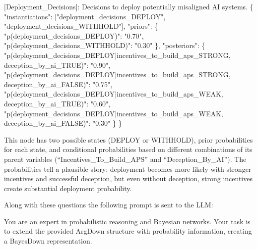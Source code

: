\documentclass[
  11pt,
  letterpaper,
  openany]{book}
\newenvironment{Shaded}{\begin{snugshade}}{\end{snugshade}}
\newcommand{\DataTypeTok}[1]{\textcolor[rgb]{0.68,0.00,0.00}{#1}}
\newcommand{\ErrorTok}[1]{\textcolor[rgb]{0.68,0.00,0.00}{#1}}
\newcommand{\FunctionTok}[1]{\textcolor[rgb]{0.28,0.35,0.67}{#1}}
\newcommand{\OtherTok}[1]{\textcolor[rgb]{0.00,0.23,0.31}{#1}}
\newcommand{\StringTok}[1]{\textcolor[rgb]{0.13,0.47,0.30}{#1}}
\begin{document}
\begin{landscape}
\begin{Shaded}
\begin{Highlighting}[]
\OtherTok{[}\ErrorTok{Deployment\_Decisions}\OtherTok{]}\ErrorTok{:} \ErrorTok{Decisions} \ErrorTok{to} \ErrorTok{deploy} \ErrorTok{potentially} \ErrorTok{misaligned} \ErrorTok{AI} \ErrorTok{systems.} \FunctionTok{\{}
  \DataTypeTok{"instantiations"}\FunctionTok{:} \OtherTok{[}\StringTok{"deployment\_decisions\_DEPLOY"}\OtherTok{,} \StringTok{"deployment\_decisions\_WITHHOLD"}\OtherTok{]}\FunctionTok{,}
  \DataTypeTok{"priors"}\FunctionTok{:} \FunctionTok{\{}
    \DataTypeTok{"p(deployment\_decisions\_DEPLOY)"}\FunctionTok{:} \StringTok{"0.70"}\FunctionTok{,}
    \DataTypeTok{"p(deployment\_decisions\_WITHHOLD)"}\FunctionTok{:} \StringTok{"0.30"}
  \FunctionTok{\},}
  \DataTypeTok{"posteriors"}\FunctionTok{:} \FunctionTok{\{}
    \DataTypeTok{"p(deployment\_decisions\_DEPLOY|incentives\_to\_build\_aps\_STRONG, deception\_by\_ai\_TRUE)"}\FunctionTok{:} \StringTok{"0.90"}\FunctionTok{,}
    \DataTypeTok{"p(deployment\_decisions\_DEPLOY|incentives\_to\_build\_aps\_STRONG, deception\_by\_ai\_FALSE)"}\FunctionTok{:} \StringTok{"0.75"}\FunctionTok{,}
    \DataTypeTok{"p(deployment\_decisions\_DEPLOY|incentives\_to\_build\_aps\_WEAK, deception\_by\_ai\_TRUE)"}\FunctionTok{:} \StringTok{"0.60"}\FunctionTok{,}
    \DataTypeTok{"p(deployment\_decisions\_DEPLOY|incentives\_to\_build\_aps\_WEAK, deception\_by\_ai\_FALSE)"}\FunctionTok{:} \StringTok{"0.30"}
  \FunctionTok{\}}
\FunctionTok{\}}
\end{Highlighting}
\end{Shaded}

This node has two possible states (DEPLOY or WITHHOLD), prior
probabilities for each state, and conditional probabilities based on
different combinations of its parent variables
(``Incentives\_To\_Build\_APS'' and ``Deception\_By\_AI''). The
probabilities tell a plausible story: deployment becomes more likely
with stronger incentives and successful deception, but even without
deception, strong incentives create substantial deployment probability.

Along with these questions the following prompt is sent to the LLM:

\begin{Shaded}
\begin{Highlighting}[]

\ErrorTok{You} \ErrorTok{are} \ErrorTok{an} \ErrorTok{expert} \ErrorTok{in} \ErrorTok{probabilistic} \ErrorTok{reasoning} \ErrorTok{and} \ErrorTok{Bayesian} \ErrorTok{networks.} \ErrorTok{Your} \ErrorTok{task} \ErrorTok{is}
\ErrorTok{to} \ErrorTok{extend} \ErrorTok{the} \ErrorTok{provided} \ErrorTok{ArgDown} \ErrorTok{structure} \ErrorTok{with} \ErrorTok{probability} \ErrorTok{information,}
\ErrorTok{creating} \ErrorTok{a} \ErrorTok{BayesDown} \ErrorTok{representation.}


\end{Highlighting}
\end{Shaded}
\end{landscape}
\end{document}
